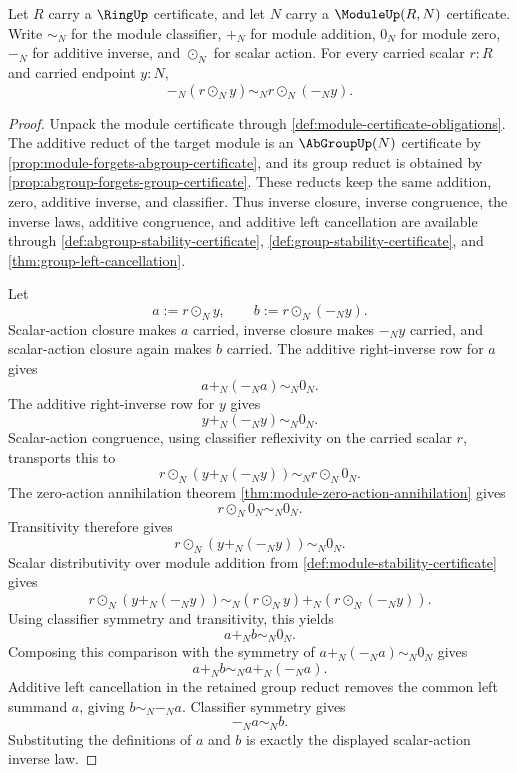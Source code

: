 \begin{lemma}
\label{lem:module-scalar-action-additive-inverse}
Let $R$ carry a $\RingUp$ certificate, and let $N$ carry a $\ModuleUp(R,N)$ certificate. Write $\sim_N$ for the module classifier, $+_N$ for module addition, $0_N$ for module zero, $-_N$ for additive inverse, and $\odot_N$ for scalar action. For every carried scalar $r:R$ and carried endpoint $y:N$,
$$
-_N(r\odot_N y)\sim_N r\odot_N(-_N y).
$$
\end{lemma}
\begin{proof}
Unpack the module certificate through \autoref{def:module-certificate-obligations}. The additive reduct of the target module is an $\AbGroupUp(N)$ certificate by \autoref{prop:module-forgets-abgroup-certificate}, and its group reduct is obtained by \autoref{prop:abgroup-forgets-group-certificate}. These reducts keep the same addition, zero, additive inverse, and classifier. Thus inverse closure, inverse congruence, the inverse laws, additive congruence, and additive left cancellation are available through \autoref{def:abgroup-stability-certificate}, \autoref{def:group-stability-certificate}, and \autoref{thm:group-left-cancellation}.

Let
$$
a:=r\odot_N y,
\qquad
b:=r\odot_N(-_N y).
$$
Scalar-action closure makes $a$ carried, inverse closure makes $-_N y$ carried, and scalar-action closure again makes $b$ carried. The additive right-inverse row for $a$ gives
$$
a+_N(-_N a)\sim_N0_N.
$$
The additive right-inverse row for $y$ gives
$$
y+_N(-_N y)\sim_N0_N.
$$
Scalar-action congruence, using classifier reflexivity on the carried scalar $r$, transports this to
$$
r\odot_N(y+_N(-_N y))\sim_N r\odot_N0_N.
$$
The zero-action annihilation theorem \autoref{thm:module-zero-action-annihilation} gives
$$
r\odot_N0_N\sim_N0_N.
$$
Transitivity therefore gives
$$
r\odot_N(y+_N(-_N y))\sim_N0_N.
$$
Scalar distributivity over module addition from \autoref{def:module-stability-certificate} gives
$$
r\odot_N(y+_N(-_N y))\sim_N (r\odot_N y)+_N(r\odot_N(-_N y)).
$$
Using classifier symmetry and transitivity, this yields
$$
a+_N b\sim_N0_N.
$$
Composing this comparison with the symmetry of $a+_N(-_N a)\sim_N0_N$ gives
$$
a+_N b\sim_N a+_N(-_N a).
$$
Additive left cancellation in the retained group reduct removes the common left summand $a$, giving $b\sim_N-_N a$. Classifier symmetry gives
$$
-_N a\sim_N b.
$$
Substituting the definitions of $a$ and $b$ is exactly the displayed scalar-action inverse law.
\end{proof}

